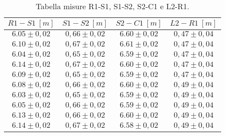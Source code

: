 \begin{table}[H]
    \centering
        \begin{tabular}{|c|c|c|c|}
        \hline
        $ R1-S1~[m] $ & $ S1-S2~[m] $ & $ S2-C1~[m] $ & $ L2-R1~[m] $\\
        \hline
        $ 6.05 \pm 0,02 $ & $ 0,66 \pm 0,02 $ & $ 6.60 \pm 0,02 $ & $ 0,47 \pm 0,04 $\\
        \hline
        $ 6.10 \pm 0,02 $ & $ 0,67 \pm 0,02 $ & $ 6.61 \pm 0,02 $ & $ 0,47 \pm 0,04 $\\
        \hline
        $ 6.04 \pm 0,02 $ & $ 0,65 \pm 0,02 $ & $ 6.59 \pm 0,02 $ & $ 0,47 \pm 0,04 $\\
        \hline
        $ 6.14 \pm 0,02 $ & $ 0,67 \pm 0,02 $ & $ 6.60 \pm 0,02 $ & $ 0,47 \pm 0,04 $\\
        \hline
        $ 6.09 \pm 0,02 $ & $ 0,65 \pm 0,02 $ & $ 6.59 \pm 0,02 $ & $ 0,47 \pm 0,04 $\\
        \hline
        $ 6.08 \pm 0,02 $ & $ 0,66 \pm 0,02 $ & $ 6.60 \pm 0,02 $ & $ 0,49 \pm 0,04 $\\
        \hline
        $ 6.03 \pm 0,02 $ & $ 0,65 \pm 0,02 $ & $ 6.59 \pm 0,02 $ & $ 0,49 \pm 0,04 $\\
        \hline
        $ 6.05 \pm 0,02 $ & $ 0,66 \pm 0,02 $ & $ 6.59 \pm 0,02 $ & $ 0,49 \pm 0,04 $\\
        \hline
        $ 6.13 \pm 0,02 $ & $ 0,66 \pm 0,02 $ & $ 6.60 \pm 0,02 $ & $ 0,49 \pm 0,04 $\\
        \hline
        $ 6.14 \pm 0,02 $ & $ 0,67 \pm 0,02 $ & $ 6.58 \pm 0,02 $ & $ 0,49 \pm 0,04 $\\
        \hline
        \end{tabular}
    \caption{Tabella misure R1-S1, S1-S2, S2-C1 e L2-R1.}
\end{table}